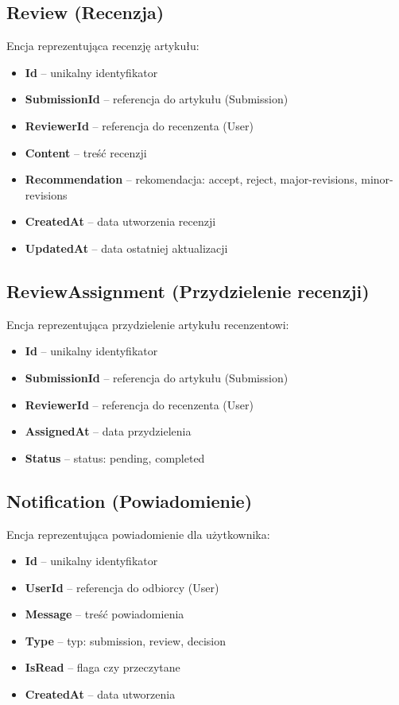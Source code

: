 \documentclass[times]{san}
\begin{document}
\subsection{Review (Recenzja)}

Encja reprezentująca recenzję artykułu:

\begin{itemize}
    \item \textbf{Id} -- unikalny identyfikator
    \item \textbf{SubmissionId} -- referencja do artykułu (Submission)
    \item \textbf{ReviewerId} -- referencja do recenzenta (User)
    \item \textbf{Content} -- treść recenzji
    \item \textbf{Recommendation} -- rekomendacja: accept, reject, major-revisions, minor-revisions
    \item \textbf{CreatedAt} -- data utworzenia recenzji
    \item \textbf{UpdatedAt} -- data ostatniej aktualizacji
\end{itemize}

\subsection{ReviewAssignment (Przydzielenie recenzji)}

Encja reprezentująca przydzielenie artykułu recenzentowi:

\begin{itemize}
    \item \textbf{Id} -- unikalny identyfikator
    \item \textbf{SubmissionId} -- referencja do artykułu (Submission)
    \item \textbf{ReviewerId} -- referencja do recenzenta (User)
    \item \textbf{AssignedAt} -- data przydzielenia
    \item \textbf{Status} -- status: pending, completed
\end{itemize}

\subsection{Notification (Powiadomienie)}

Encja reprezentująca powiadomienie dla użytkownika:

\begin{itemize}
    \item \textbf{Id} -- unikalny identyfikator
    \item \textbf{UserId} -- referencja do odbiorcy (User)
    \item \textbf{Message} -- treść powiadomienia
    \item \textbf{Type} -- typ: submission, review, decision
    \item \textbf{IsRead} -- flaga czy przeczytane
    \item \textbf{CreatedAt} -- data utworzenia
\end{itemize}
\end{document}
